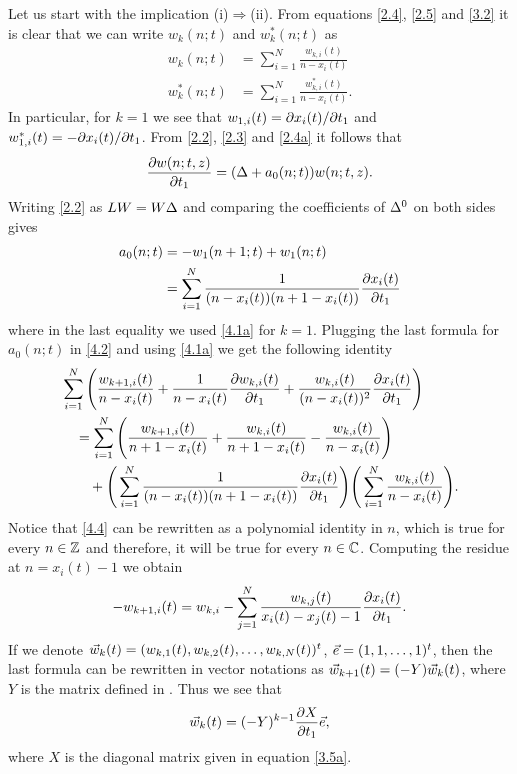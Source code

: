 \documentclass[11pt,reqno]{amsart}
\theoremstyle{definition}
\numberwithin{equation}{section}
\begin{document}
Let us start with the implication (i)$\Rightarrow$(ii).
From equations \eqref{2.4}, \eqref{2.5} and \eqref{3.2} it is clear that we 
can write $w_k(n;t)$ and $w^*_k(n;t)$ as 
\begin{subequations}\label{4.1}
\begin{align}                                                
w_k(n;t)&=\sum_{i=1}^N \frac{w_{k,i}(t)}{n-x_i(t)}      \label{4.1a} \\
w^*_k(n;t)&=\sum_{i=1}^N \frac{w^*_{k,i}(t)}{n-x_i(t)}. \label{4.1b} 
\end{align}
\end{subequations}
In particular, for $k=1$ we see that $w_{1,i}(t)=\partial x_i(t)/\partial t_1$
and $w^*_{1,i}(t)=-\partial x_i(t)/\partial t_1$.
From \eqref{2.2}, \eqref{2.3} and \eqref{2.4a} it follows that 
\begin{equation}                                                \label{4.2}
\frac{\partial w(n;t,z)}{\partial t_1}=(\Delta+a_0(n;t))w(n;t,z).
\end{equation}
Writing \eqref{2.2} as $LW=W\Delta$ and comparing the coefficients of $\Delta^0$ on
both sides gives
\begin{align}
a_0(n;t) & =-w_1(n+1;t)+w_1(n;t)\nonumber \\
& = \sum_{i=1}^N \frac{1}{(n-x_i(t))(n+1-x_i(t))} 
\frac{\partial x_i(t)}{\partial t_1}\label{4.3}
\end{align}
where in the last equality we used \eqref{4.1a} for $k=1$. Plugging the last 
formula for $a_0(n;t)$ in \eqref{4.2} and using \eqref{4.1a} we get the 
following identity
\begin{align}
&\sum_{i=1}^N\Bigg(\frac{w_{k+1,i}(t)}{n-x_i(t)}
+\frac{1}{n-x_i(t)} \frac{\partial w_{k,i}(t)}{\partial t_1}
+\frac{w_{k,i}(t)}{(n-x_i(t))^2}\frac{\partial x_i(t)}{\partial t_1}\Bigg)
                                                            \nonumber\\
&\quad =\sum_{i=1}^N\Bigg(\frac{w_{k+1,i}(t)}{n+1-x_i(t)}
+\frac{w_{k,i}(t)}{n+1-x_i(t)}
-\frac{w_{k,i}(t)}{n-x_i(t)}\Bigg)                          \label{4.4}\\
&\qquad + 
\Bigg(\sum_{i=1}^N\frac{1}{(n-x_i(t))(n+1-x_i(t))}
\frac{\partial x_i(t)}{\partial t_1}\Bigg)
\Bigg(\sum_{i=1}^N\frac{w_{k,i}(t)}{n-x_i(t)}\Bigg). 
\nonumber
\end{align}
Notice that \eqref{4.4} can be rewritten as a polynomial identity in $n$, 
which is true for every $n\in\mathbb Z$ and therefore, it will be true for every 
$n\in\mathbb C$. Computing the residue at $n=x_i(t)-1$ we obtain 
\begin{equation}\label{4.5}
-w_{k+1,i}(t)=w_{k,i}-\sum_{j=1}^{N}\frac{w_{k,j}(t)}{x_i(t)-x_j(t)-1}
\frac{\partial x_i(t)}{\partial t_1}.
\end{equation}
If we denote ${\vec{w}}_k(t)=(w_{k,1}(t),w_{k,2}(t),\dots,w_{k,N}(t))^t$, 
${\vec{e}}=(1,1,\dots,1)^t$, then the last formula can be rewritten in vector 
notations as ${\vec{w}}_{k+1}(t)=(-Y){\vec{w}}_k(t)$, where $Y$ is the matrix defined in 
.
Thus we see that
\begin{equation}                                             \label{4.6}
{\vec{w}}_k(t)=(-Y)^{k-1}\frac{\partial X}{\partial t_1}{\vec{e}}, 
\end{equation}
where $X$ is the diagonal matrix given in equation \eqref{3.5a}.
\end{document}
